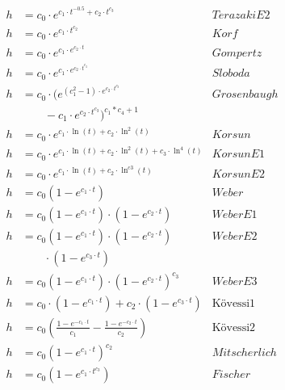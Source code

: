 \documentclass[a4paper,twocolumn]{article}
\begin{document}
\begin{table*}
\begin{minipage}[t]{.5\textwidth}
\begin{align*}
  \label{eq:terazakiE2}
  h & = c_0 \cdot e^{c_1\cdot t^{-0.5} + c_2\cdot t^{c_3}} & TerazakiE2 \tag{3.2}\\
  \label{eq:korf}
  h & = c_0 \cdot e^{c_1\cdot t^{c_2}} & Korf \tag{3.3}\\
  \label{eq:gomperz}
  h &= c_0 \cdot e^{c_1 \cdot e^{c_2 \cdot t}} & Gompertz \tag{3.4}\\
  \label{eq:sloboda}
  h &= c_0 \cdot e^{c_1 \cdot e^{c_2 \cdot t^{c_3}}} & Sloboda \tag{3.5}\\
  \label{eq:Grosenbaugh}
  h &= c_0 \cdot (e^{(c_1^2-1) \cdot e^{c_2 \cdot t^{c_3}}} & Grosenbaugh \tag{3.6}\\
  \nonumber & \qquad - c_1 \cdot e^{c_2 \cdot t^{c_3}})^{c_1*c_4+1}\\
  \label{eq:korsun}
  h & = c_0 \cdot e^{c_1 \cdot \ln(t)+c_2 \cdot \ln^2(t)} & Korsun \tag{3.7}\\
  \label{eq:korsunE1}
  h & = c_0 \cdot e^{c_1 \cdot \ln(t)+c_2 \cdot \ln^2(t)+c_3 \cdot \ln^4(t)} & KorsunE1 \tag{3.8}\\
  \label{eq:korsunE2}
  h & = c_0 \cdot e^{c_1 \cdot \ln(t)+c_2 \cdot \ln^{c3}(t)} & KorsunE2 \tag{3.9}\\[1em]
  \label{eq:weber}
  h & = c_0 (1 - e^{c_1 \cdot t} ) & Weber \tag{4.0}\\
  \label{eq:weberE1}
  h & = c_0 (1 - e^{c_1 \cdot t} ) \cdot (1 - e^{c_2 \cdot t} ) & WeberE1 \tag{4.1}\\
  \label{eq:weberE2}
  h & = c_0 (1 - e^{c_1 \cdot t} ) \cdot (1 - e^{c_2 \cdot t} ) & WeberE2 \tag{4.2}\\
  \nonumber & \qquad \cdot (1 - e^{c_3 \cdot t} )\\
  \label{eq:weberE3}
  h & = c_0 (1 - e^{c_1 \cdot t} ) \cdot (1 - e^{c_2 \cdot t} )^{c_3} & WeberE3 \tag{4.3}\\
  \label{eq:koevessi1}
  h &= c_0 \cdot (1 - e^{c_1\cdot t}) + c_2 \cdot (1 - e^{c_3\cdot t}) & \text{K\"ovessi1} \tag{4.4}\\
  \label{eq:koevessi2}
  h &= c_0(\frac{1 - e^{-c_1\cdot t}}{c_1} - \frac{1 - e^{-c_2\cdot t}}{c_2}) & \text{K\"ovessi2} \tag{4.5}\\
  \label{eq:mitscherlich}
  h & = c_0 (1 - e^{c_1 \cdot t} )^{c_2} &
  Mitscherlich \tag{4.6}\\
  \label{eq:fischer}
  h & = c_0 (1 - e^{c_1 \cdot t^{c_3}} ) & Fischer \tag{4.7}\\

\end{align*}
\end{minipage}
\end{table*}
\end{document}
